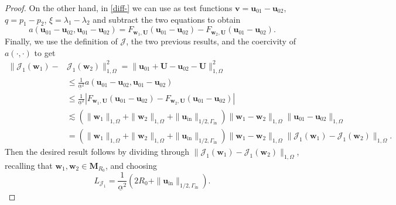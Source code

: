 \documentclass[10pt,a4paper]{amsart}
\newcommand\Gi{\Gamma_{\mathrm{in}}}
\newcommand\bM{\mathbf{M}}
\newcommand\bU{\boldsymbol{U}}
\newcommand\buin{\boldsymbol{u}_{\mathrm{in}}}
\newcommand\bu{\boldsymbol{u}}
\newcommand\bv{\boldsymbol{v}}
\newcommand\bw{\boldsymbol{w}}
\begin{document}
\begin{proof}
On the other hand, in \eqref{diff-} we can use as test functions $\bv =\bu_{01}-\bu_{02} $, $q = p_1-p_2$, $\xi = \lambda_1-\lambda_2$ and subtract the two equations  to obtain 
\[
    a(\bu_{01}-\bu_{02},\bu_{01}-\bu_{02}) = F_{\bw_1,\bU}(\bu_{01}-\bu_{02}) -F_{\bw_2,\bU}(\bu_{01}-\bu_{02}). 
\]
Finally, we use the definition of $\mathcal{J}$, the two previous results, and the coercivity of  $a(\cdot,\cdot)$ to get 
\begin{align*}
    \|\mathcal{J}_1(\bw_1)- &\mathcal{J}_1(\bw_2)\|^2_{1,\Omega}  = \|\bu_{01}+\bU-\bu_{02}-\bU\|^2_{1,\Omega} \\
    & \leq \frac{1}{\underline{\alpha}^2}  a(\bu_{01}-\bu_{02},\bu_{01}-\bu_{02}) \\
    & \leq  \frac{1}{\underline{\alpha}^2} | F_{\bw_1,\bU}(\bu_{01}-\bu_{02}) -F_{\bw_2,\bU}(\bu_{01}-\bu_{02})| \\
    & \lesssim (\|\bw_1\|_{1,\Omega} + \|\bw_2\|_{1,\Omega} + \|\buin\|_{1/2,\Gi}) \|\bw_1-\bw_2\|_{1,\Omega}\|\bu_{01}-\bu_{02}\|_{1,\Omega} \\
    & = (\|\bw_1\|_{1,\Omega} + \|\bw_2\|_{1,\Omega} + \|\buin\|_{1/2,\Gi}) \|\bw_1-\bw_2\|_{1,\Omega}\|\mathcal{J}_1(\bw_1)- \mathcal{J}_1(\bw_2)\|_{1,\Omega}.
\end{align*}
Then the desired result follows by dividing through $\|\mathcal{J}_1(\bw_1)- \mathcal{J}_1(\bw_2)\|_{1,\Omega}$,   recalling that $\bw_1,\bw_2\in \bM_{R_0}$, and choosing 
\begin{equation}\label{eq:choosing-L} L_{\mathcal{J}_1} =  \frac{1}{\underline{\alpha}^2}(2R_0 + \|\buin\|_{1/2,\Gi}). \end{equation}
\end{proof}
\end{document}
